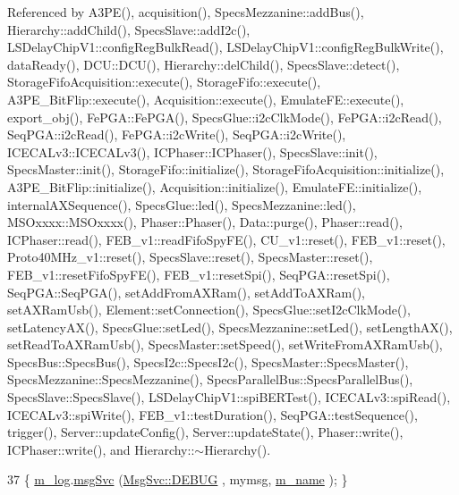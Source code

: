 Referenced by A3\+P\+E(), acquisition(), Specs\+Mezzanine\+::add\+Bus(), Hierarchy\+::add\+Child(), Specs\+Slave\+::add\+I2c(), L\+S\+Delay\+Chip\+V1\+::config\+Reg\+Bulk\+Read(), L\+S\+Delay\+Chip\+V1\+::config\+Reg\+Bulk\+Write(), data\+Ready(), D\+C\+U\+::\+D\+C\+U(), Hierarchy\+::del\+Child(), Specs\+Slave\+::detect(), Storage\+Fifo\+Acquisition\+::execute(), Storage\+Fifo\+::execute(), A3\+P\+E\+\_\+\+Bit\+Flip\+::execute(), Acquisition\+::execute(), Emulate\+F\+E\+::execute(), export\+\_\+obj(), Fe\+P\+G\+A\+::\+Fe\+P\+G\+A(), Specs\+Glue\+::i2c\+Clk\+Mode(), Fe\+P\+G\+A\+::i2c\+Read(), Seq\+P\+G\+A\+::i2c\+Read(), Fe\+P\+G\+A\+::i2c\+Write(), Seq\+P\+G\+A\+::i2c\+Write(), I\+C\+E\+C\+A\+Lv3\+::\+I\+C\+E\+C\+A\+Lv3(), I\+C\+Phaser\+::\+I\+C\+Phaser(), Specs\+Slave\+::init(), Specs\+Master\+::init(), Storage\+Fifo\+::initialize(), Storage\+Fifo\+Acquisition\+::initialize(), A3\+P\+E\+\_\+\+Bit\+Flip\+::initialize(), Acquisition\+::initialize(), Emulate\+F\+E\+::initialize(), internal\+A\+X\+Sequence(), Specs\+Glue\+::led(), Specs\+Mezzanine\+::led(), M\+S\+Oxxxx\+::\+M\+S\+Oxxxx(), Phaser\+::\+Phaser(), Data\+::purge(), Phaser\+::read(), I\+C\+Phaser\+::read(), F\+E\+B\+\_\+v1\+::read\+Fifo\+Spy\+F\+E(), C\+U\+\_\+v1\+::reset(), F\+E\+B\+\_\+v1\+::reset(), Proto40\+M\+Hz\+\_\+v1\+::reset(), Specs\+Slave\+::reset(), Specs\+Master\+::reset(), F\+E\+B\+\_\+v1\+::reset\+Fifo\+Spy\+F\+E(), F\+E\+B\+\_\+v1\+::reset\+Spi(), Seq\+P\+G\+A\+::reset\+Spi(), Seq\+P\+G\+A\+::\+Seq\+P\+G\+A(), set\+Add\+From\+A\+X\+Ram(), set\+Add\+To\+A\+X\+Ram(), set\+A\+X\+Ram\+Usb(), Element\+::set\+Connection(), Specs\+Glue\+::set\+I2c\+Clk\+Mode(), set\+Latency\+A\+X(), Specs\+Glue\+::set\+Led(), Specs\+Mezzanine\+::set\+Led(), set\+Length\+A\+X(), set\+Read\+To\+A\+X\+Ram\+Usb(), Specs\+Master\+::set\+Speed(), set\+Write\+From\+A\+X\+Ram\+Usb(), Specs\+Bus\+::\+Specs\+Bus(), Specs\+I2c\+::\+Specs\+I2c(), Specs\+Master\+::\+Specs\+Master(), Specs\+Mezzanine\+::\+Specs\+Mezzanine(), Specs\+Parallel\+Bus\+::\+Specs\+Parallel\+Bus(), Specs\+Slave\+::\+Specs\+Slave(), L\+S\+Delay\+Chip\+V1\+::spi\+B\+E\+R\+Test(), I\+C\+E\+C\+A\+Lv3\+::spi\+Read(), I\+C\+E\+C\+A\+Lv3\+::spi\+Write(), F\+E\+B\+\_\+v1\+::test\+Duration(), Seq\+P\+G\+A\+::test\+Sequence(), trigger(), Server\+::update\+Config(), Server\+::update\+State(), Phaser\+::write(), I\+C\+Phaser\+::write(), and Hierarchy\+::$\sim$\+Hierarchy().


\begin{DoxyCode}
37 \{ \hyperlink{classObject_a0d269813dd7ac1f24bc143031e2963f2}{m\_log}.\hyperlink{classMsgSvc_ad25f18047920cc59a314e5098259711c}{msgSvc} (\hyperlink{classMsgSvc_ae671eb7301996cd049d2da8a65925926a1dbdcc82dce88370ec335883c83b38b0}{MsgSvc::DEBUG}   , mymsg, \hyperlink{classObject_a8b83c95c705d2c3ba0d081fe1710f48d}{m\_name} ); \}
\end{DoxyCode}
\mbox{\label{classObject_a6c9a0397ca804e04d675ed05683f5420}} 
